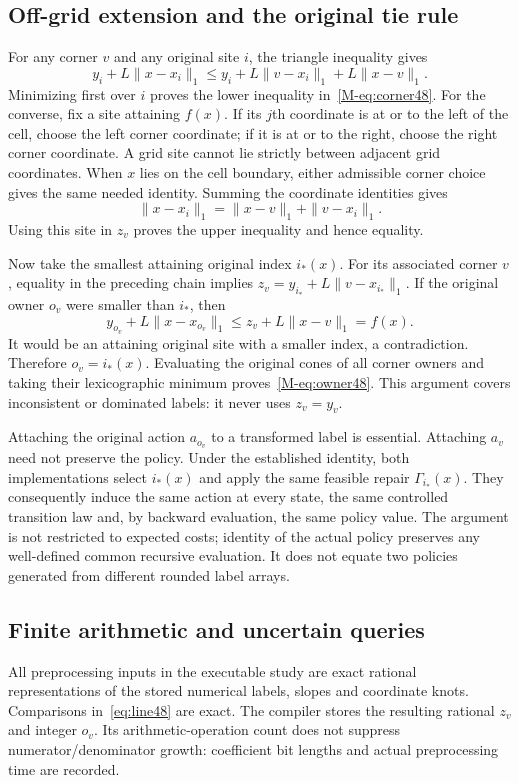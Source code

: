 \subsection{Off-grid extension and the original tie rule}
For any corner $v$ and any original site $i$, the triangle inequality gives
\[
 y_i+L\|x-x_i\|_1\le y_i+L\|v-x_i\|_1+L\|x-v\|_1.
\]
Minimizing first over $i$ proves the lower inequality in~\eqref{M-eq:corner48}. For the converse, fix a site attaining $f(x)$. If its $j$th coordinate is at or to the left of the cell, choose the left corner coordinate; if it is at or to the right, choose the right corner coordinate. A grid site cannot lie strictly between adjacent grid coordinates. When $x$ lies on the cell boundary, either admissible corner choice gives the same needed identity. Summing the coordinate identities gives
\[
 \|x-x_i\|_1=\|x-v\|_1+\|v-x_i\|_1.
\]
Using this site in $z_v$ proves the upper inequality and hence equality.

Now take the smallest attaining original index $i_*(x)$. For its associated corner $v$, equality in the preceding chain implies
$z_v=y_{i_*}+L\|v-x_{i_*}\|_1$.
If the original owner $o_v$ were smaller than $i_*$, then
\[
 y_{o_v}+L\|x-x_{o_v}\|_1
 \le z_v+L\|x-v\|_1=f(x).
\]
It would be an attaining original site with a smaller index, a contradiction. Therefore $o_v=i_*(x)$. Evaluating the original cones of all corner owners and taking their lexicographic minimum proves~\eqref{M-eq:owner48}. This argument covers inconsistent or dominated labels: it never uses $z_v=y_v$.

Attaching the original action $a_{o_v}$ to a transformed label is essential. Attaching $a_v$ need not preserve the policy. Under the established identity, both implementations select $i_*(x)$ and apply the same feasible repair $\Gamma_{i_*}(x)$. They consequently induce the same action at every state, the same controlled transition law and, by backward evaluation, the same policy value. The argument is not restricted to expected costs; identity of the actual policy preserves any well-defined common recursive evaluation. It does not equate two policies generated from different rounded label arrays.

\subsection{Finite arithmetic and uncertain queries}
All preprocessing inputs in the executable study are exact rational representations of the stored numerical labels, slopes and coordinate knots. Comparisons in~\eqref{eq:line48} are exact. The compiler stores the resulting rational $z_v$ and integer $o_v$. Its arithmetic-operation count does not suppress numerator/denominator growth: coefficient bit lengths and actual preprocessing time are recorded.

